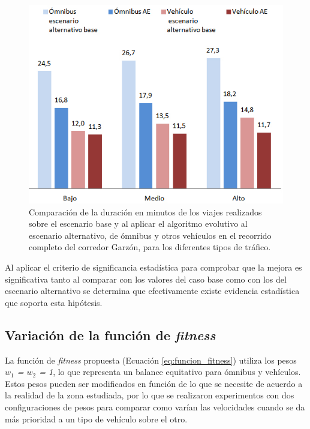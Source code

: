 \begin{figure}[ht]
	\centering
	\includegraphics[width=0.8\linewidth]{Figures/duracio_viajes_alternativo}
	\caption[Comparación de la duración de los viajes en minutos entre el escenario base y el algoritmo evolutivo sobre el escenario alternativo.]{Comparación de la duración en minutos de los viajes realizados sobre el escenario base y al aplicar el algoritmo evolutivo  al escenario alternativo, de ómnibus y otros vehículos en el recorrido completo del corredor Garzón, para los diferentes tipos de tráfico.}
	\label{fig:duracion_viajes_alernativo}
\end{figure}

Al aplicar el criterio de significancia estadística para comprobar que la mejora es significativa tanto al comparar con los valores del caso base como con los del escenario alternativo se determina que efectivamente existe evidencia estadística que soporta esta hipótesis.

\subsection{Variación de la función de \emph{fitness}}

La función de \emph{fitness} propuesta (Ecuación \ref{eq:funcion_fitness}) utiliza los pesos \emph{$w_1$ = $w_2$ = 1}, lo que representa un balance equitativo para ómnibus y vehículos. Estos pesos pueden ser modificados en función de lo que se necesite de acuerdo a la realidad de la zona estudiada, por lo que se realizaron experimentos con dos configuraciones de pesos para comparar como varían las velocidades cuando se da más prioridad a un tipo de vehículo sobre el otro.



